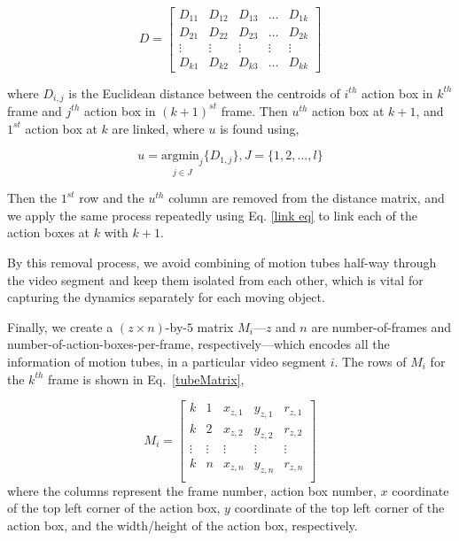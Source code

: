 \begin{equation}
D=\begin{bmatrix}
    D_{11}       & D_{12} & D_{13} & \dots & D_{1k} \\
    D_{21}       & D_{22} & D_{23} & \dots & D_{2k} \\
    \vdots       & \vdots & \vdots & \vdots & \vdots \\
    D_{k1}       & D_{k2} & D_{k3} & \dots & D_{kk}
\end{bmatrix}
\end{equation}

where $D_{i,j}$ is the Euclidean distance between the centroids of $i^{th}$ action box in $k^{th}$ frame and $j^{th}$ action box in $(k+1)^{st}$ frame.
Then $u^{th}$ action box at $k+1$, and $1^{st}$ action box at $k$ are linked, where $u$ is found using,



\begin{equation}
u=\underset{j\in J}{\mathrm{argmin}_j}\{D_{1,j}\}, J=\{1,2,\dots,l\}
\label{link eq}
\end{equation}


Then the $1^{st}$ row and the $u^{th}$ column are removed from the distance matrix, and we apply the same process repeatedly using Eq. \ref{link eq}
to link each of the action boxes at $k$ with $k+1$.

By this removal process, we avoid combining of motion tubes half-way through
the video segment and keep them isolated from each other, which is vital for capturing the dynamics separately for each moving object.





Finally, we create a $(z\times n)$-by-$5$ matrix $M_{i}$---$z$ and $n$ are number-of-frames and number-of-action-boxes-per-frame, respectively---which
encodes all the information of motion tubes, in a particular video segment $i$. The rows of $M_{i}$ for the $k^{th}$ frame is shown in Eq.~\ref{tubeMatrix},

\begin{equation}
M_{i}=\begin{bmatrix}
    k       & 1 & x_{z,1} & y_{z,1} & r_{z,1} \\
    k       & 2 & x_{z,2} & y_{z,2} & r_{z,2} \\
    \vdots       & \vdots & \vdots & \vdots & \vdots \\
    k       & n & x_{z,n} & y_{z,n} & r_{z,n} \\
\end{bmatrix}
\label{tubeMatrix}
\end{equation}
where the columns represent the frame number, action box number, $x$ coordinate of the top left corner of the action box,
$y$ coordinate of the top left corner of the action box, and the width/height of the action box, respectively.


